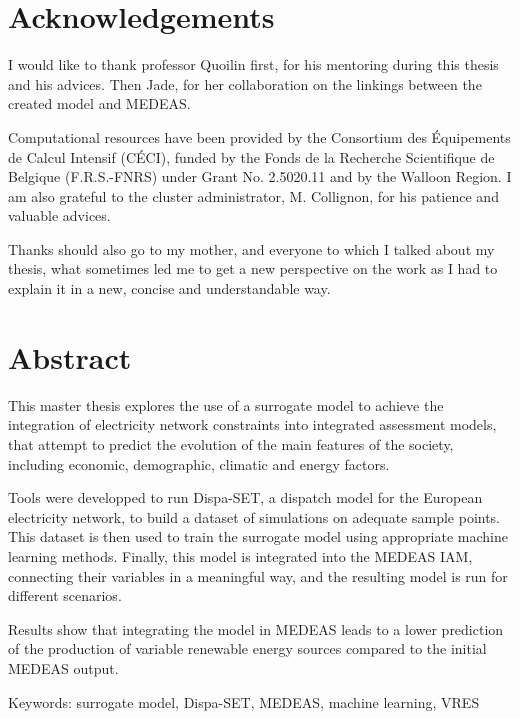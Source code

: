\section*{Acknowledgements}

I would like to thank professor Quoilin first, for his mentoring during this thesis and his advices. Then Jade, for her collaboration on the linkings between the created model and MEDEAS.

Computational resources have been provided by the Consortium des Équipements de Calcul Intensif (CÉCI), funded by the Fonds de la Recherche Scientifique de Belgique (F.R.S.-FNRS) under Grant No. 2.5020.11 and by the Walloon Region. I am also grateful to the cluster administrator, M. Collignon, for his patience and valuable advices.

Thanks should also go to my mother, and everyone to which I talked about my thesis, what sometimes led me to get a new perspective on the work as I had to explain it in a new, concise and understandable way.

\newpage

\section*{Abstract}

This master thesis explores the use of a surrogate model to achieve the integration of electricity network constraints into integrated assessment models, that attempt to predict the evolution of the main features of the society, including economic, demographic, climatic and energy factors.

Tools were developped to run Dispa-SET, a dispatch model for the European electricity network, to build a dataset of simulations on adequate sample points. This dataset is then used to train the surrogate model using appropriate machine learning methods. Finally, this model is integrated into the MEDEAS IAM, connecting their variables in a meaningful way, and the resulting model is run for different scenarios.

Results show that integrating the model in MEDEAS leads to a lower prediction of the production of variable renewable energy sources compared to the initial MEDEAS output.

\vspace{1cm}
Keywords: surrogate model, Dispa-SET, MEDEAS, machine learning, VRES

\newpage

\tableofcontents

